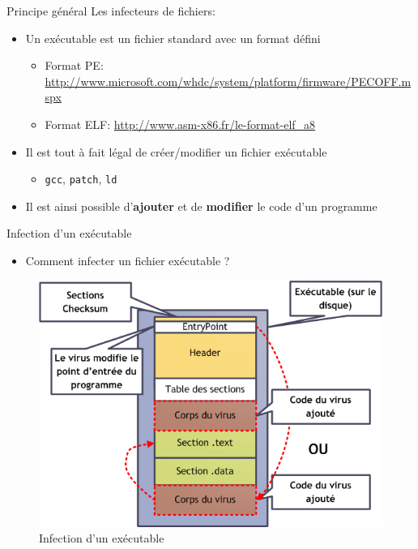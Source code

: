 \documentclass{beamer}
\begin{document}
\begin{frame}{Principe général}
Les infecteurs de fichiers:
\begin{itemize}
\item Un exécutable est un fichier standard avec un format défini 
\begin{itemize}
\item Format PE: \url{http://www.microsoft.com/whdc/system/platform/firmware/PECOFF.mspx}
\item Format ELF: \url{http://www.asm-x86.fr/le-format-elf_a8}
\end{itemize}
\item Il est tout à fait légal de créer/modifier un fichier exécutable
\begin{itemize}
\item \texttt{gcc}, \texttt{patch}, \texttt{ld}
\end{itemize}
\item Il est ainsi possible d'\textbf{ajouter} et de \textbf{modifier} le code d'un programme
\end{itemize}
\end{frame}


\begin{frame}{Infection d'un exécutable}
\begin{itemize}
\item Comment infecter un fichier exécutable ?
\end{itemize}
\begin{figure}[!ht]
\includegraphics[scale=0.3]{infection.png}
\center
\caption{Infection d'un exécutable}
\end{figure}

\end{frame}
\end{document}
